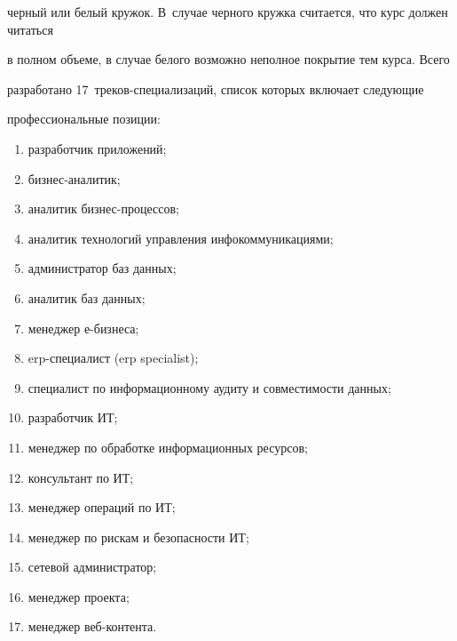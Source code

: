 \begin{enumerate}[1.]
черный или белый кружок. В~случае черного кружка считается, что курс должен читаться 

в полном объеме, в случае белого возможно неполное покрытие тем курса. Всего 

разработано 17~тре\-ков-спе\-ци\-а\-ли\-за\-ций, список которых включает следующие 

профессиональные позиции:

\begin{enumerate}[(1)]

\item разработчик приложений; 

\item бизнес-аналитик;

\item аналитик бизнес-процессов; 

\item аналитик технологий управления инфокоммуникациями;

\item администратор баз данных;

\item аналитик баз данных; 

\item менеджер е-бизнеса; 

\item erp-специалист (erp specialist); 

\item специалист по информационному аудиту и совместимости данных; 

\item разработчик ИТ; 

\item менеджер по обработке информационных ресурсов; 

\item консультант по ИТ; 

\item менеджер операций по ИТ;

\item менеджер по рискам и безопасности ИТ;

\item сетевой администратор; 

\item менеджер проекта; 

\item менеджер веб-контента.

\end{enumerate}


\end{enumerate}
